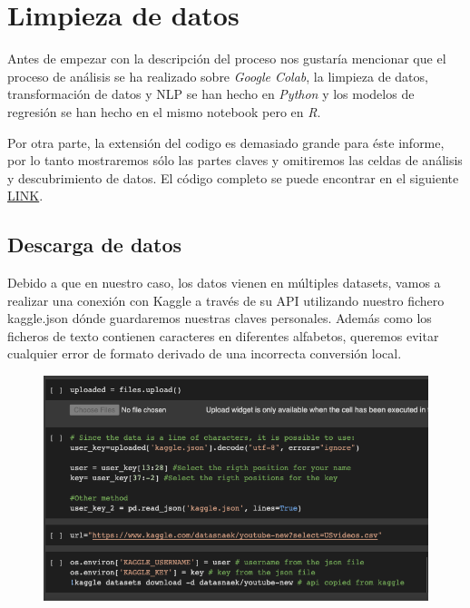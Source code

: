 \documentclass[a4paper,12pt]{article}
\begin{document}
\section[item_limpieza]{Limpieza de datos}

Antes de empezar con la descripci\'on del proceso nos gustar\'ia mencionar que el proceso de an\'alisis se ha realizado sobre {\itshape Google Colab}, la limpieza de datos, transformaci\'on de datos y NLP se han hecho en {\itshape Python} y los modelos de regresi\'on se han hecho en el mismo notebook pero en {\itshape R}. 

Por otra parte, la extensi\'on del codigo es demasiado grande para \'este informe, por lo tanto mostraremos s\'olo las partes claves y omitiremos las celdas de an\'alisis y descubrimiento de datos. El c\'odigo completo se puede encontrar en el siguiente \href{https://github.com/b-suarez/youtube_stats_analysis}{LINK}.

\subsection{Descarga de datos}
Debido a que en nuestro caso, los datos vienen en m\'ultiples datasets, vamos a realizar una conexi\'on con Kaggle a trav\'es de su API utilizando nuestro fichero kaggle.json d\'onde guardaremos nuestras claves personales. Adem\'as como los ficheros de texto contienen caracteres en diferentes alfabetos, queremos evitar cualquier error de formato derivado de una incorrecta conversi\'on local.

\begin{figure}[h!]
 \centering
\includegraphics[width=13cm]{kaggle_upload.png}
\end{figure}
\end{document}
